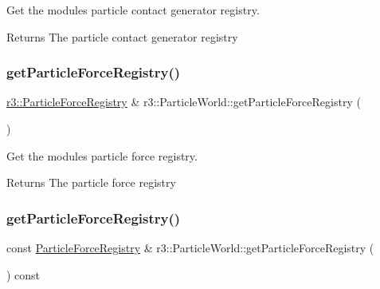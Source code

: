 Get the module\textquotesingle{}s particle contact generator registry. 

\begin{DoxyReturn}{Returns}
The particle contact generator registry 
\end{DoxyReturn}
\mbox{\label{classr3_1_1_particle_world_aaa3f952fdfd8862673d41afa078245bf}} 
\subsubsection{\texorpdfstring{get\+Particle\+Force\+Registry()}{getParticleForceRegistry()}\hspace{0.1cm}{\footnotesize\ttfamily [1/2]}}
{\footnotesize\ttfamily \mbox{\hyperlink{classr3_1_1_particle_force_registry}{r3\+::\+Particle\+Force\+Registry}} \& r3\+::\+Particle\+World\+::get\+Particle\+Force\+Registry (\begin{DoxyParamCaption}{ }\end{DoxyParamCaption})}



Get the module\textquotesingle{}s particle force registry. 

\begin{DoxyReturn}{Returns}
The particle force registry 
\end{DoxyReturn}
\mbox{\label{classr3_1_1_particle_world_add0e006264e25065ff226eafc0c1a29d}} 
\subsubsection{\texorpdfstring{get\+Particle\+Force\+Registry()}{getParticleForceRegistry()}\hspace{0.1cm}{\footnotesize\ttfamily [2/2]}}
{\footnotesize\ttfamily const \mbox{\hyperlink{classr3_1_1_particle_force_registry}{Particle\+Force\+Registry}} \& r3\+::\+Particle\+World\+::get\+Particle\+Force\+Registry (\begin{DoxyParamCaption}{ }\end{DoxyParamCaption}) const}



